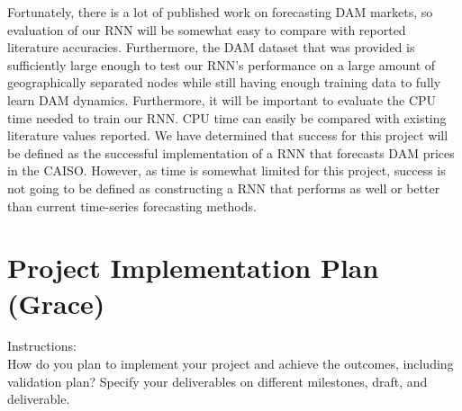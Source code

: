 \documentclass[sigconf]{acmart}
\begin{document}
%

Fortunately, there is a lot of published work on forecasting DAM markets, so evaluation of our RNN will be somewhat easy to compare with reported literature accuracies. Furthermore, the DAM dataset that was provided is sufficiently large enough to test our RNN's performance on a large amount of geographically separated nodes while still having enough training data to fully learn DAM dynamics. Furthermore, it will be important to evaluate the CPU time needed to train our RNN. CPU time can easily be compared with existing literature values reported. We have determined that success for this project will be defined as the successful implementation of a RNN that forecasts DAM prices in the CAISO. However, as time is somewhat limited for this project, success is not going to be defined as constructing a RNN that performs as well or better than current time-series forecasting methods.  


\section{Project Implementation Plan (Grace)}
Instructions:\\
How do you plan to implement your project and achieve the outcomes, including validation plan? Specify your deliverables on different milestones, draft, and deliverable. 
\end{document}
